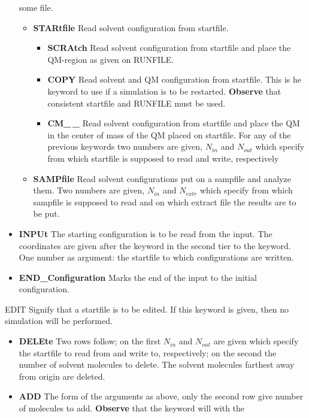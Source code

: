 \begin{keywordlist}
\begin{itemize}
some file.
\begin{itemize}
\item {\bf STARtfile} Read solvent configuration from startfile.
\begin{itemize}
\item {\bf SCRAtch} Read solvent configuration from startfile and place
the QM-region as given on RUNFILE.
\item {\bf COPY} Read solvent and QM configuration from startfile.
This is he keyword to use if a simulation is to be restarted.
{\bf Observe} that consistent startfile and RUNFILE must be used.
\item {\bf CM\_\,\_} Read solvent configuration from startfile and place
the QM in the center of mass of the QM placed on startfile.
 For any of the previous keywords two numbers are given, $N_{in}$ and $N_{out}$ which specify from
which startfile  is supposed to read and write,
respectively
\end{itemize}
\item {\bf SAMPfile} Read solvent configurations put on a
sampfile and analyze them. Two numbers are given, $N_{in}$ and
$N_{extr}$ which specify from which sampfile  is
supposed to read and on which extract file the results are to
be put.
\end{itemize}
\item {\bf INPUt} The starting configuration is to be read from
the input. The coordinates are given after the keyword
 in the second tier to the 
keyword. One number as argument: the startfile to which
configurations are written.
\item {\bf END\_Configuration} Marks the end of the input to the initial configuration.
\end{itemize}
\item[EDIT]
Signify that a startfile is to be edited. If this keyword is
given, then no simulation will be performed.
\begin{itemize}
\item {\bf DELEte} Two rows follow; on the first $N_{in}$ and $N_{out}$
are given which specify the startfile to read from and write to,
respectively; on the second the number of solvent molecules to
delete. The solvent molecules farthest away from origin are
deleted.
\item {\bf ADD} The form of the arguments as 
above, only the second row give number of molecules to add.
{\bf Observe} that the keyword  will with the

\end{itemize}
\end{keywordlist}
